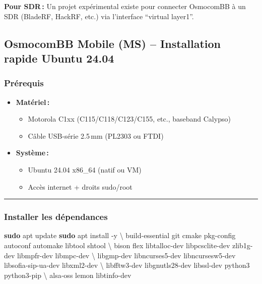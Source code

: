\documentclass[
  french,
]{article}
\newenvironment{Shaded}{\begin{snugshade}}{\end{snugshade}}
\newcommand{\AttributeTok}[1]{\textcolor[rgb]{0.13,0.29,0.53}{#1}}
\newcommand{\DataTypeTok}[1]{\textcolor[rgb]{0.13,0.29,0.53}{#1}}
\newcommand{\FunctionTok}[1]{\textcolor[rgb]{0.13,0.29,0.53}{\textbf{#1}}}
\newcommand{\NormalTok}[1]{#1}
\providecommand{\tightlist}{%
  \setlength{\itemsep}{0pt}\setlength{\parskip}{0pt}}
\begin{document}
\textbf{Pour SDR\,:} Un projet expérimental existe pour connecter
OsmocomBB à un SDR (BladeRF, HackRF, etc.) via l'interface ``virtual
layer1''.

\subsection{OsmocomBB Mobile (MS) -- Installation rapide Ubuntu
24.04}\label{osmocombb-mobile-ms-installation-rapide-ubuntu-24.04}

\subsubsection{Prérequis}\label{pruxe9requis}

\begin{itemize}
\item
  \textbf{Matériel\,:}

  \begin{itemize}
  \tightlist
  \item
    Motorola C1xx (C115/C118/C123/C155, etc., baseband Calypso)
  \item
    Câble USB-série 2.5\,mm (PL2303 ou FTDI)
  \end{itemize}
\item
  \textbf{Système\,:}

  \begin{itemize}
  \tightlist
  \item
    Ubuntu 24.04 x86\_64 (natif ou VM)
  \item
    Accès internet + droits sudo/root
  \end{itemize}
\end{itemize}

\begin{center}\rule{0.5\linewidth}{0.5pt}\end{center}

\subsubsection{Installer les
dépendances}\label{installer-les-duxe9pendances}

\begin{Shaded}
\begin{Highlighting}[]
\FunctionTok{sudo}\NormalTok{ apt update}
\FunctionTok{sudo}\NormalTok{ apt install }\AttributeTok{{-}y} \DataTypeTok{\textbackslash{}}
\NormalTok{  build{-}essential git cmake pkg{-}config autoconf automake libtool shtool }\DataTypeTok{\textbackslash{}}
\NormalTok{  bison flex libtalloc{-}dev libpcsclite{-}dev zlib1g{-}dev libmpfr{-}dev libmpc{-}dev }\DataTypeTok{\textbackslash{}}
\NormalTok{  libgmp{-}dev libncurses5{-}dev libncursesw5{-}dev libsofia{-}sip{-}ua{-}dev libxml2{-}dev }\DataTypeTok{\textbackslash{}}
\NormalTok{  libfftw3{-}dev libgnutls28{-}dev libssl{-}dev python3 python3{-}pip }\DataTypeTok{\textbackslash{}}
\NormalTok{  alsa{-}oss lemon libtinfo{-}dev}
\end{Highlighting}
\end{Shaded}
\end{document}

